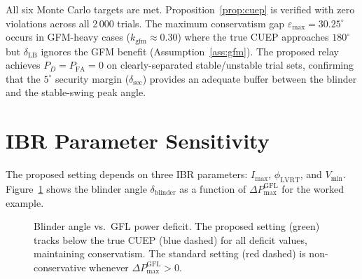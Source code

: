 \documentclass[11pt,a4paper]{article}
\newcommand{\dlb}{\delta_{\mathrm{LB}}}   %
\begin{document}
All six Monte Carlo targets are met.
Proposition~\ref{prop:cuep} is verified with zero violations across all 2\,000 trials.
The maximum conservatism gap $\varepsilon_{\max} = 30.25^\circ$ occurs in GFM-heavy
cases ($k_{\mathrm{gfm}} \approx 0.30$) where the true CUEP approaches $180^\circ$
but $\dlb$ ignores the GFM benefit (Assumption~\ref{ass:gfm}).
The proposed relay achieves $P_D = P_{\mathrm{FA}} = 0$ on clearly-separated
stable/unstable trial sets, confirming that the $5^\circ$ security margin
($\delta_{\mathrm{sec}}$) provides an adequate buffer between the
blinder and the stable-swing peak angle.

\section{IBR Parameter Sensitivity}
\label{sec:sensitivity}

The proposed setting depends on three IBR parameters:
$I_{\max}$, $\phi_{\mathrm{LVRT}}$, and $V_{\min}$.
Figure~\ref{fig:sensitivity} shows the blinder angle $\delta_{\mathrm{blinder}}$
as a function of $\Delta P_{\max}^{\mathrm{GFL}}$ for the worked example.

\begin{figure}[ht]
\centering
{}
\caption{Blinder angle vs.\ GFL power deficit.  The proposed setting (green)
tracks below the true CUEP (blue dashed) for all deficit values, maintaining
conservatism.  The standard setting (red dashed) is non-conservative whenever
$\Delta P_{\max}^{\mathrm{GFL}} > 0$.}
\label{fig:sensitivity}
\end{figure}
\end{document}
